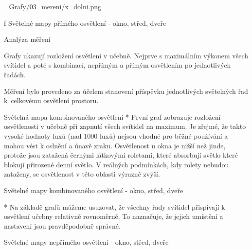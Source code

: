 \medskip {}
\picw=15cm _Grafy/03_mereni/x_dolni.png
\caption/f Světelné mapy přímého osvětlení - okno, střed, dveře
\medskip


\secc Analýza měření

Grafy ukazují rozložení osvětlení v učebně. Nejprve s maximálním výkonem všech svítidel a poté s kombinací,
nepřímým a přímým osvětlením po jednotlivých řadách.



Měření bylo provedeno za účelem stanovení příspěvku jednotlivých světelných řad k~celkovému osvětlení prostoru.

\medskip {} Světelná mapa kombinovaného osvětlení
\begitems
  *  První graf zobrazuje rozložení osvětlenosti v učebně při zapnutí všech svítidel na maximum. Je zřejmé, že takto vysoké hodnoty luxů (nad 1000 luxů)
       nejsou vhodné pro běžné používání a mohou vést k oslnění a únavě zraku.
       Osvětlenost u okna je nižší než jinde, protože jsou zatažená černými látkovými roletami,
       které absorbují světlo které blokují přirozené denní světlo.
       V reálných podmínkách, kdy rolety nebudou zataženy, se osvětlenost v této oblasti výrazně zvýší.
\enditems


\medskip {} Světelné mapy kombinovaného osvětlení - okno, střed, dveře


\begitems
    * Na základě grafů můžeme usuzovat, že všechny řady svítidel přispívají k osvětlení učebny relativně rovnoměrně.
        To naznačuje, že jejich umístění a nastavení jsou pravděpodobně správné.
\enditems

\medskip {} Světelné mapy nepřímého osvětlení - okno, střed, dveře

